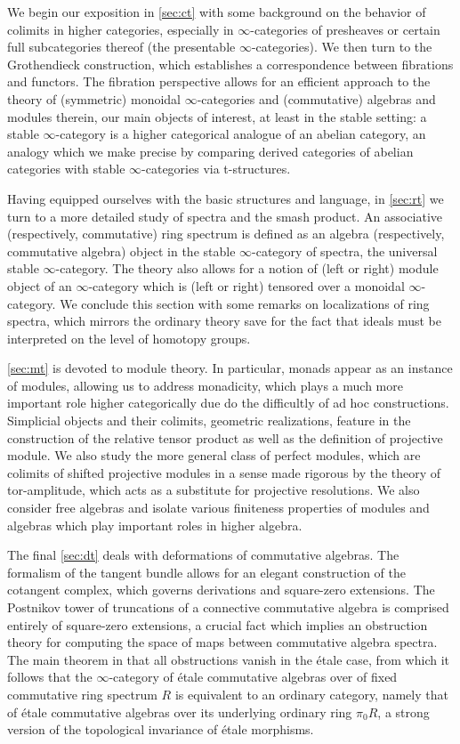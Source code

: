 \documentclass[12pt]{article}
\theoremstyle{definition}
\renewcommand{\i}{\infty}
\begin{document}
We begin our exposition in \autoref{sec:ct} with some background on the behavior of colimits in higher categories, especially in $\i$-categories of presheaves or certain full subcategories thereof (the presentable $\i$-categories).
We then turn to the Grothendieck construction, which establishes a correspondence between fibrations and functors. The fibration perspective allows for an efficient approach to the theory of (symmetric) monoidal $\i$-categories and (commutative) algebras and modules therein, our main objects of interest, at least in the stable setting: a stable $\i$-category is a higher categorical analogue of an abelian category, an analogy which we make precise by comparing derived categories of abelian categories with stable $\i$-categories via t-structures.

Having equipped ourselves with the basic structures and language, in \autoref{sec:rt} we turn to a more detailed study of spectra and the smash product.
An associative (respectively, commutative) ring spectrum is defined as an algebra (respectively, commutative algebra) object in the stable $\i$-category of spectra, the universal stable $\i$-category.
The theory also allows for a notion of (left or right) module object of an $\i$-category which is (left or right) tensored over a monoidal $\i$-category.
We conclude this section with some remarks on localizations of ring spectra, which mirrors the ordinary theory save for the fact that ideals must be interpreted on the level of homotopy groups. 


\autoref{sec:mt} is devoted to module theory.
In particular, monads appear as an instance of modules, allowing us to address monadicity, which plays a much more important role higher categorically due do the difficultly of ad hoc constructions.
Simplicial objects and their colimits, geometric realizations, feature in the construction of the relative tensor product as well as the definition of projective module.
We also study the more general class of perfect modules, which are colimits of shifted projective modules in a sense made rigorous by the theory of tor-amplitude, which acts as a substitute for projective resolutions.
We also consider free algebras and isolate various finiteness properties of modules and algebras which play important roles in higher algebra.

The final \autoref{sec:dt} deals with deformations of commutative algebras.
The formalism of the tangent bundle allows for an elegant construction of the cotangent complex, which governs derivations and square-zero extensions.
The Postnikov tower of truncations of a connective commutative algebra is comprised entirely of square-zero extensions, a crucial fact which implies an obstruction theory for computing the space of maps between commutative algebra spectra.
The main theorem in that all obstructions vanish in the \'etale case, from which it follows that the $\i$-category of \'etale commutative algebras over of fixed commutative ring spectrum $R$ is equivalent to an ordinary category, namely that of \'etale commutative algebras over its underlying ordinary ring $\pi_0 R$, a strong version of the topological invariance of \'etale morphisms.
\end{document}
